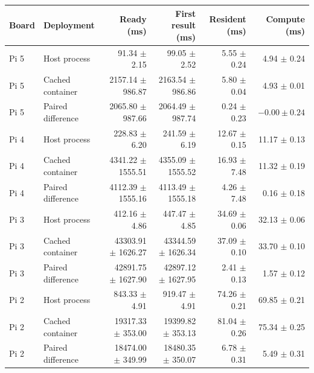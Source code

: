 \begin{tabular}{llrrrr}
\toprule
Board & Deployment & Ready (ms) & First result (ms) & Resident (ms) & Compute (ms) \\
\midrule
Pi 5 & Host process & 91.34 $\pm$ 2.15 & 99.05 $\pm$ 2.52 & 5.55 $\pm$ 0.24 & 4.94 $\pm$ 0.24 \\
Pi 5 & Cached container & 2157.14 $\pm$ 986.87 & 2163.54 $\pm$ 986.86 & 5.80 $\pm$ 0.04 & 4.93 $\pm$ 0.01 \\
Pi 5 & Paired difference & 2065.80 $\pm$ 987.66 & 2064.49 $\pm$ 987.74 & 0.24 $\pm$ 0.23 & $-0.00\pm0.24$ \\
\addlinespace
Pi 4 & Host process & 228.83 $\pm$ 6.20 & 241.59 $\pm$ 6.19 & 12.67 $\pm$ 0.15 & 11.17 $\pm$ 0.13 \\
Pi 4 & Cached container & 4341.22 $\pm$ 1555.51 & 4355.09 $\pm$ 1555.52 & 16.93 $\pm$ 7.48 & 11.32 $\pm$ 0.19 \\
Pi 4 & Paired difference & 4112.39 $\pm$ 1555.16 & 4113.49 $\pm$ 1555.18 & 4.26 $\pm$ 7.48 & 0.16 $\pm$ 0.18 \\
\addlinespace
Pi 3 & Host process & 412.16 $\pm$ 4.86 & 447.47 $\pm$ 4.85 & 34.69 $\pm$ 0.06 & 32.13 $\pm$ 0.06 \\
Pi 3 & Cached container & 43303.91 $\pm$ 1626.27 & 43344.59 $\pm$ 1626.34 & 37.09 $\pm$ 0.10 & 33.70 $\pm$ 0.10 \\
Pi 3 & Paired difference & 42891.75 $\pm$ 1627.90 & 42897.12 $\pm$ 1627.95 & 2.41 $\pm$ 0.13 & 1.57 $\pm$ 0.12 \\
\addlinespace
Pi 2 & Host process & 843.33 $\pm$ 4.91 & 919.47 $\pm$ 4.91 & 74.26 $\pm$ 0.21 & 69.85 $\pm$ 0.21 \\
Pi 2 & Cached container & 19317.33 $\pm$ 353.00 & 19399.82 $\pm$ 353.13 & 81.04 $\pm$ 0.26 & 75.34 $\pm$ 0.25 \\
Pi 2 & Paired difference & 18474.00 $\pm$ 349.99 & 18480.35 $\pm$ 350.07 & 6.78 $\pm$ 0.31 & 5.49 $\pm$ 0.31 \\
\bottomrule
\end{tabular}
